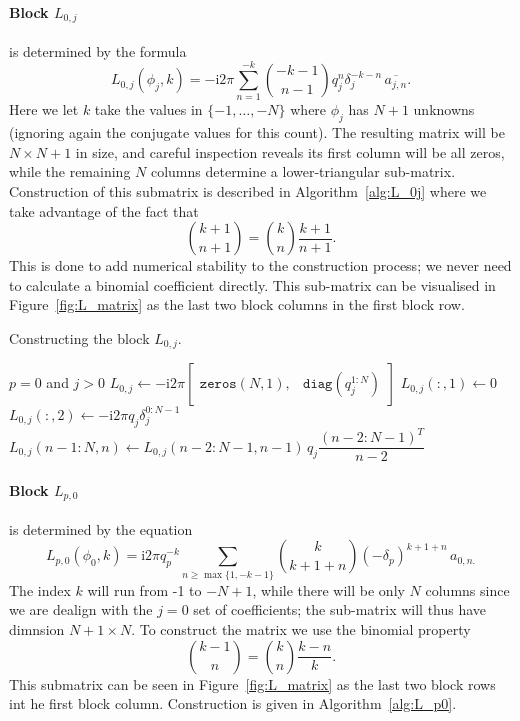 \documentclass[12pt,a4paper,fleqn]{article}
\newcommand{\conj}[1]{\overline{#1}}
\renewcommand{\i}{\mathrm{i}}
\begin{document}
\paragraph{Block $L_{0,j}$} is determined by the formula
\begin{equation}
  L_{0,j}(\phi_j,k) = -\i2\pi \sum_{n=1}^{-k} \binom{-k-1}{n-1} q_j^n \delta_j^{-k-n} \,\conj{a_{j,n}}.
  \label{eq:block_L0j}
\end{equation}
Here we let $k$ take the values in $\{-1, \dots, -N\}$ where $\phi_j$ has $N+1$ unknowns (ignoring again the conjugate values for this count). The resulting matrix will be $N\times N + 1$ in size, and careful inspection reveals its first column will be all zeros, while the remaining $N$ columns determine a lower-triangular sub-matrix. Construction of this submatrix is described in Algorithm~\ref{alg:L_0j} where we take advantage of the fact that
\begin{equation}
  \binom{k+1}{n+1} = \binom{k}{n} \frac{k+1}{n+1}.
\end{equation}
This is done to add numerical stability to the construction process; we never need to calculate a binomial coefficient directly. This sub-matrix can be visualised in Figure~\ref{fig:L_matrix} as the last two block columns in the first block row.

\begin{algorithm}
  \caption{Constructing the block $L_{0,j}$.}
  \label{alg:L_0j}
  \begin{algorithmic}[1]
    \REQUIRE $p = 0$ and $j > 0$
      \STATE $L_{0,j} \leftarrow -\i2\pi \begin{bmatrix} \mathtt{zeros}(N, 1), & \mathtt{diag}(q_j^{1:N}) \end{bmatrix}$
    \ELSE[$\delta_j \ne 0$]
      \STATE $L_{0,j}(:,1) \leftarrow 0$
      \STATE $L_{0,j}(:,2) \leftarrow -\i2\pi q_j \delta_j^{0:N-1}$
        \STATE $L_{0,j}(n-1:N, n) \leftarrow L_{0,j}(n-2:N-1,n-1) \,q_j \dfrac{(n-2:N-1)^T}{n-2}$
      \ENDFOR
    \ENDIF
  \end{algorithmic}
\end{algorithm}

\paragraph{Block $L_{p,0}$} is determined by the equation
\begin{equation}
  L_{p,0}(\phi_0,k) = \i2\pi q_p^{-k} \sum_{n\ge\max\{1,-k-1\}} \binom{k}{k+1+n} (-\delta_p)^{k+1+n} \,a_{0,n.}
  \label{eq:block_Lp0}
\end{equation}
The index $k$ will run from -1 to $-N+1$, while there will be only $N$ columns since we are dealign with the $j=0$ set of coefficients; the sub-matrix will thus have dimnsion $N+1\times N$. To construct the matrix we use the binomial property
\begin{equation}
  \binom{k-1}{n} = \binom{k}{n} \frac{k-n}{k}.
\end{equation}
This submatrix can be seen in Figure~\ref{fig:L_matrix} as the last two block rows int he first block column. Construction is given in Algorithm~\ref{alg:L_p0}.
\end{document}
